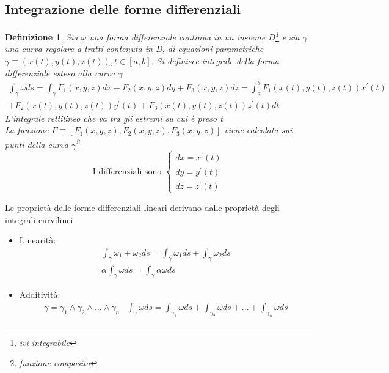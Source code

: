 \documentclass{book}
\newtheorem{defi}{Definizione}
\begin{document}
\subsection{Integrazione delle forme differenziali}
\begin{defi}
	Sia $\omega$ una forma differenziale continua in un insieme
	$D$\footnote{ivi integrabile} e sia $\gamma$ una curva regolare a tratti
	contenuta in D, di equazioni parametriche $\gamma \equiv (x(t),y(t), z(t)),
	t\in [a,b]$. Si definisce {\color{red}integrale della forma differenziale
	esteso alla curva $\gamma$}
	\begin{eqnarray*}
		\int_{\gamma} \omega ds=\int_{\gamma}
		F_1(x,y,z)dx+F_2(x,y,z)dy+F_3(x,y,z)dz=\int_{a}^{b}
		F_1(x(t),y(t),z(t))x^\prime (t)\\
		+F_2(x(t),y(t),z(t))y^\prime (t) + F_3(x(t),y(t),z(t))z^\prime (t)dt
	\end{eqnarray*}
	L'integrale rettilineo che va tra gli estremi su cui è preso t\\
	La funzione $F\equiv[F_1(x,y,z),F_2(x,y,z),F_3(x,y,z)]$ viene calcolata
	sui punti della curva $\gamma$\footnote{funzione composita}
	\begin{equation*}
		\text{I differenziali sono } \begin{cases}
			dx=x^\prime(t)\\
			dy=y^\prime(t)\\
			dz=z^\prime(t)
		\end{cases}
	\end{equation*}
\end{defi}
Le {\color{red} proprietà delle forme differenziali lineari} derivano dalle
proprietà degli integrali curvilinei
\begin{itemize}
	\item Linearità:
		\begin{eqnarray*}
			\int_{\gamma}\omega_1 +\omega_2 ds=\int_\gamma \omega_1ds
			+\int_\gamma \omega_2 ds\\
			\alpha\int_\gamma \omega ds=\int_\gamma \alpha \omega ds 
		\end{eqnarray*}
	\item Additività:
		\begin{eqnarray*}
			\gamma=\gamma_1\wedge \gamma_2\wedge \dots \wedge \gamma_n &
			\int_\gamma \omega ds =\int_{\gamma_1} \omega ds + \int_{\gamma_2}
			\omega ds + \dots +\int_{\gamma_n} \omega ds
		\end{eqnarray*}
\end{itemize}
\end{document}
